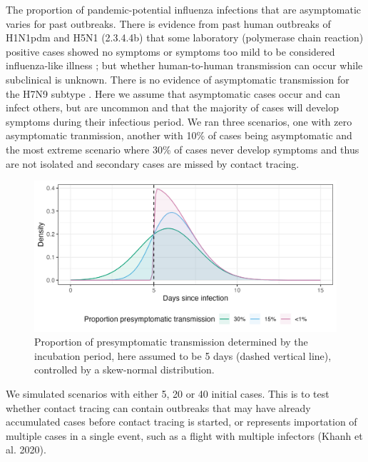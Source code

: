 \documentclass{article}
\begin{document}
The proportion of pandemic-potential influenza infections that are asymptomatic varies for past outbreaks. There is evidence from past human outbreaks of H1N1pdm and H5N1 (2.3.4.4b) that some laboratory (polymerase chain reaction) positive cases showed no symptoms or symptoms too mild to be considered influenza-like illness \citep{lesslerOutbreak2009Pandemic2009, gargHighlyPathogenicAvian2025}; but whether human-to-human transmission can occur while subclinical is unknown. There is no evidence of asymptomatic transmission for the H7N9 subtype \citep{xuSerologicalInvestigationSubclinical2013}. Here we assume that asymptomatic cases occur and can infect others, but are uncommon and that the majority of cases will develop symptoms during their infectious period.  We ran three scenarios, one with zero asymptomatic tranmission, another with 10\% of cases being asymptomatic and the most extreme scenario where 30\% of cases never develop symptoms and thus are not isolated and secondary cases are missed by contact tracing. \\

\begin{figure}[ht]
\centering
\includegraphics[width=\textwidth]{../plots/prop_presymptomatic_transmission.png}
\caption{Proportion of presymptomatic transmission determined by the incubation period, here assumed to be 5 days (dashed vertical line), controlled by a skew-normal distribution.}
\label{fig:prop-presym-trans}
\end{figure}

\clearpage

We simulated scenarios with either 5, 20 or 40 initial cases. This is to test whether contact tracing can contain outbreaks that may have already accumulated cases before contact tracing is started, or represents importation of multiple cases in a single event, such as a flight with multiple infectors (Khanh et al. 2020). \\
\end{document}
